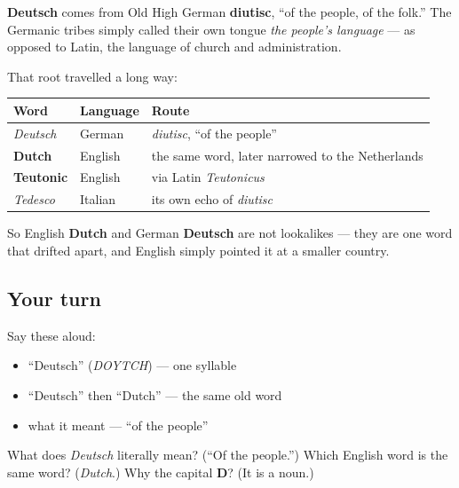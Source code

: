 \begin{cousinweb}
\textbf{Deutsch} comes from Old High German \textbf{diutisc}, \textquotedblleft{}of the people, of the folk.\textquotedblright{} The Germanic tribes simply called their own tongue \emph{the people's language} — as opposed to Latin, the language of church and administration.

That root travelled a long way:

\noindent
\begin{tabularx}{\linewidth}{@{}>{\raggedright\arraybackslash}X>{\raggedright\arraybackslash}X>{\raggedright\arraybackslash}X@{}}
\toprule
\textbf{Word} & \textbf{Language} & \textbf{Route} \\
\midrule
\emph{Deutsch} & German & \emph{diutisc}, \textquotedblleft{}of the people\textquotedblright{} \\
\textbf{Dutch} & English & the same word, later narrowed to the Netherlands \\
\textbf{Teutonic} & English & via Latin \emph{Teutonicus} \\
\emph{Tedesco} & Italian & its own echo of \emph{diutisc} \\
\bottomrule
\end{tabularx}

So English \textbf{Dutch} and German \textbf{Deutsch} are not lookalikes — they are one word that drifted apart, and English simply pointed it at a smaller country.
\end{cousinweb}

\subsection*{Your turn}
Say these aloud:

\begin{itemize}
\raggedright
  \item \textquotedblleft{}Deutsch\textquotedblright{} (\emph{DOYTCH}) — one syllable
  \item \textquotedblleft{}Deutsch\textquotedblright{} then \textquotedblleft{}Dutch\textquotedblright{} — the same old word
  \item what it meant — \textquotedblleft{}of the people\textquotedblright{}
\end{itemize}

\begin{tcolorbox}[breakable,colback=teal!4,colframe=teal!35!black,title={Before you move on}]
What does \emph{Deutsch} literally mean? (\textquotedblleft{}Of the people.\textquotedblright{}) Which English word is the same word? (\emph{Dutch}.) Why the capital \textbf{D}? (It is a noun.)
\end{tcolorbox}
